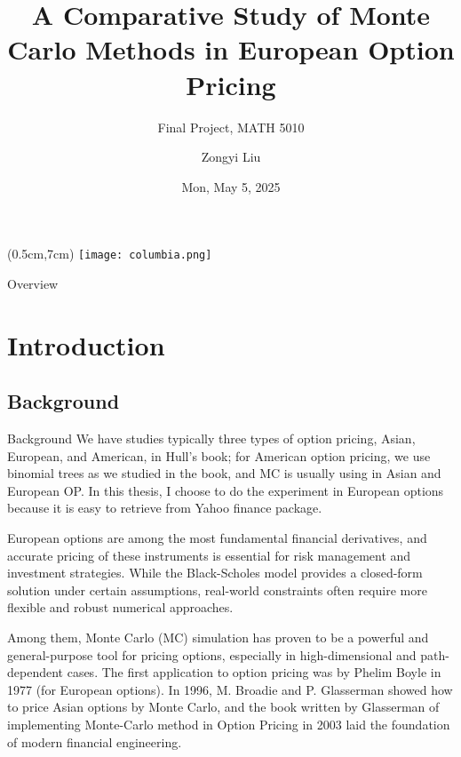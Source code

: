 \documentclass[aspectratio=169,xcolor=dvipsnames]{beamer}
\title{A Comparative Study of Monte Carlo Methods in European Option Pricing}
\subtitle{Final Project, MATH 5010}
\author{Zongyi Liu}
\date{Mon, May 5, 2025} %
\begin{document}
	
	\begin{frame}
		\titlepage
		
		\begin{textblock*}{3cm}(0.5cm,7cm) 
			\texttt{[image: columbia.png]}
		\end{textblock*}
	
	\end{frame}
	
	\begin{frame}{Overview}
		\tableofcontents
	\end{frame}
	
	\section{Introduction}
	
	\subsection{{Background}}
	\begin{frame}{Background}
		We have studies typically three types of option pricing, Asian, European, and American, in Hull's book; for American option pricing, we use binomial trees as we studied in the book, and MC is usually using in Asian and European OP. In this thesis, I choose to do the experiment in European options because it is easy to retrieve from Yahoo finance package. 
		
		European options are among the most fundamental financial derivatives, and accurate pricing of these instruments is essential for risk management and investment strategies. While the Black-Scholes model provides a closed-form solution under certain assumptions, real-world constraints often require more flexible and robust numerical approaches. 
		
		Among them, Monte Carlo (MC) simulation has proven to be a powerful and general-purpose tool for pricing options, especially in high-dimensional and path-dependent cases. The first application to option pricing was by Phelim Boyle in 1977 (for European options). In 1996, M. Broadie and P. Glasserman showed how to price Asian options by Monte Carlo, and the book written by Glasserman of implementing Monte-Carlo method in Option Pricing in 2003 laid the foundation of modern financial engineering. 

	\end{frame}
\end{document}
